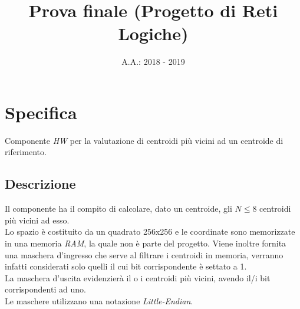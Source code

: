 \documentclass[a4paper]{report}
\begin{document}
\title{Prova finale (Progetto di Reti Logiche)}
\date{A.A.: 2018 - 2019}
\maketitle
\tableofcontents

\chapter{Specifica}
Componente {\it HW} per la valutazione di centroidi più vicini ad un centroide di riferimento.

\section{Descrizione}
Il componente ha il compito di calcolare, dato un centroide, gli $N \leq 8$ centroidi più vicini ad esso.\\
Lo spazio è costituito da un quadrato 256x256 e le coordinate sono memorizzate in una memoria {\it RAM}, la quale non è parte del progetto.
Viene inoltre fornita una maschera d'ingresso che serve al filtrare i centroidi in memoria, verranno infatti considerati solo quelli il cui bit corrispondente è settato a 1.\\
La maschera d'uscita evidenzierà il o i centroidi più vicini, avendo il/i bit corrispondenti ad uno.\\
Le maschere utilizzano una notazione {\it Little-Endian}.
\end{document}
